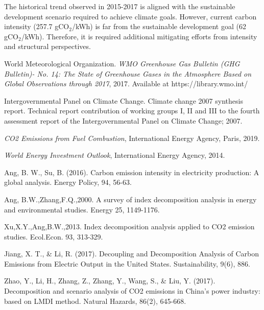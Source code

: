 \documentclass[energies,article,accept,moreauthors,12pt,a4paper]{mdpi} %
\begin{document}
 The historical trend observed in 2015-2017 is aligned with the sustainable development scenario required to achieve climate goals. However, current carbon intensity (257.7 gCO$_2$/kWh) is far from the sustainable development goal (62 gCO$_2$/kWh). Therefore, it is  required additional mitigating efforts from intensity and structural perspectives.

 
 
\begin{thebibliography}{1}

World Meteorological Organization. \textit{WMO Greenhouse Gas Bulletin (GHG Bulletin)- No. 14: The State of Greenhouse Gases in the Atmosphere Based on Global Observations through 2017}, 2017. Available at https://library.wmo.int/  

   Intergovernmental Panel on Climate Change.  Climate change 2007 synthesis report. Technical report contribution of working
groups I, II and III to the fourth assessment report of the Intergovernmental Panel
on Climate Change; 2007.

 


  \textit{CO2 Emissions from Fuel Combustion}, International Energy Agency, Paris, 2019.

  \textit{World Energy Investment Outlook}, International Energy Agency, 2014.

  Ang, B. W.,  Su, B. (2016). Carbon emission intensity in electricity production: A global analysis. Energy Policy, 94, 56-63.






  Ang, B.W.,Zhang,F.Q.,2000. A survey of index decomposition analysis in energy
and environmental studies. Energy 25, 1149-1176.

  Xu,X.Y.,Ang,B.W.,2013. Index decomposition analysis applied to CO2 emission
studies. Ecol.Econ. 93, 313-329.

 Jiang, X. T., \& Li, R. (2017). Decoupling and Decomposition Analysis of Carbon Emissions from Electric Output in the United States. Sustainability, 9(6), 886.


  Zhao, Y., Li, H., Zhang, Z., Zhang, Y., Wang, S., \& Liu, Y. (2017). Decomposition and scenario analysis of CO2 emissions in China's power industry: based on LMDI method. Natural Hazards, 86(2), 645-668.



\end{thebibliography}
\end{document}
